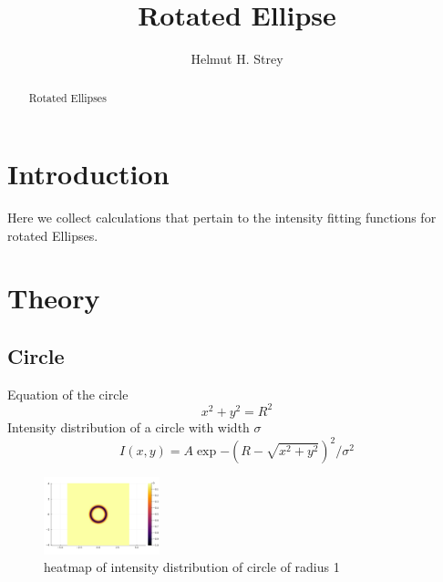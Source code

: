 \documentclass{article}
\title{Rotated Ellipse}
\author{Helmut H. Strey}
\begin{document}
\maketitle

\begin{abstract}
Rotated Ellipses
\end{abstract}

\section{Introduction}

Here we collect calculations that pertain to the intensity fitting functions for rotated Ellipses.

\section{Theory}

\subsection{Circle}
Equation of the circle
\begin{equation}
    x^{2}+y^{2}=R^{2}
\end{equation}
Intensity distribution of a circle with width $\sigma$
\begin{equation}
    I(x,y)=A\exp{-(R-\sqrt{x^{2}+y^{2}})^{2}/\sigma^{2}}
\end{equation}
\begin{figure}
\centering
\includegraphics[width=0.3\textwidth]{circle.png}
\caption{\label{fig:frog}heatmap of intensity distribution of circle of radius 1}
\end{figure}
\end{document}
